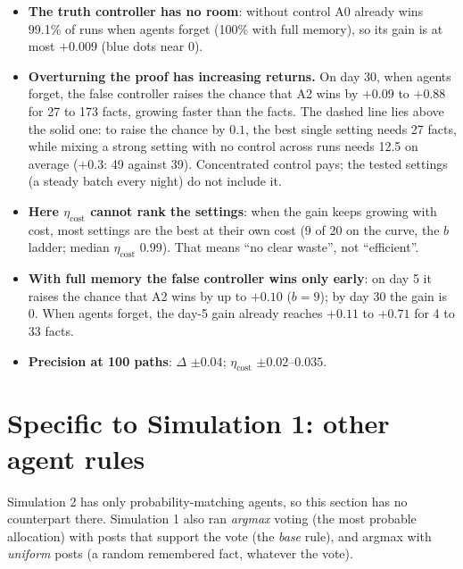 \documentclass[10pt,a4paper]{article}
\begin{document}
\begin{itemize}\itemsep1pt
\item \textbf{The truth controller has no room}: without control A0 already wins 99.1\% of runs when
  agents forget (100\% with full memory), so its gain is at most $+0.009$ (blue dots near 0).
\item \textbf{Overturning the proof has increasing returns.} On day 30, when agents forget, the false
  controller raises the chance that A2 wins by $+0.09$ to $+0.88$ for 27 to 173 facts, growing faster
  than the facts. The dashed line lies above the solid one: to raise the chance by $0.1$, the best
  single setting needs 27 facts, while mixing a strong setting with no control across runs needs 12.5
  on average ($+0.3$: 49 against 39). Concentrated control pays; the tested settings (a steady batch
  every night) do not include it.
\item \textbf{Here $\eta_{\text{cost}}$ cannot rank the settings}: when the gain keeps growing with
  cost, most settings are the best at their own cost (9 of 20 on the curve, the $b$ ladder; median
  $\eta_{\text{cost}}$ 0.99). That means ``no clear waste'', not ``efficient''.
\item \textbf{With full memory the false controller wins only early}: on day 5 it raises the chance
  that A2 wins by up to $+0.10$ ($b = 9$); by day 30 the gain is 0. When agents forget, the day-5 gain
  already reaches $+0.11$ to $+0.71$ for 4 to 33 facts.
\item \textbf{Precision at 100 paths}: $\Delta$ $\pm0.04$; $\eta_{\text{cost}}$ $\pm0.02$--$0.035$.
\end{itemize}

\section{Specific to Simulation 1: other agent rules}\label{sec:rules}

Simulation 2 has only probability-matching agents, so this section has no counterpart there. Simulation 1
also ran \emph{argmax} voting (the most probable allocation) with posts that support the vote (the
\emph{base} rule), and argmax with \emph{uniform} posts (a random remembered fact, whatever the vote).
\end{document}
